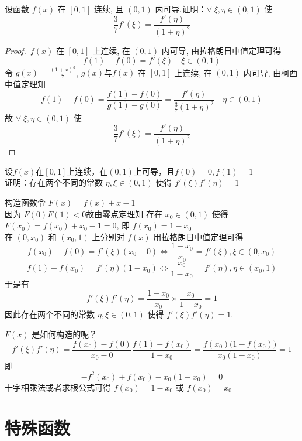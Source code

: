 \documentclass[color=green,titlestyle=hang]{elegantbook}%
\begin{document}
\begin{example}
设函数 $f(x)$ 在 $[0,1]$ 连续, 且 $(0,1)$ 内可导.证明：$\forall\;\xi,\eta\in(0,1)$ 使 \[\frac{3}{7}f'(\xi)=\frac{f'(\eta)}{(1+\eta)^2}\]
\end{example}\begin{proof}
\,$f(x)$ 在 $[0,1]$ 上连续,  在 $(0,1)$ 内可导, 由拉格朗日中值定理可得
\[f(1)-f(0)=f'(\xi)\quad\xi\in(0,1)\]
令 $g(x)=\frac{(1+x)^3}{7}$,  $g(x)$与$f(x)$ 在 $[0,1]$ 上连续,  在 $(0,1)$ 内可导, 由柯西中值定理知  \[f(1)-f(0)=\frac{f(1)-f(0)}{g(1)-g(0)}=\frac{f'(\eta)}{\frac{3}{7}(1+\eta)^2}\quad\eta\in(0,1)\]
故 $\forall\;\xi,\eta\in(0,1)$ 使 \[\frac{3}{7}f'(\xi)=\frac{f'(\eta)}{(1+\eta)^2}\]	
\end{proof}

\begin{example}
设$f(x)$在$[0,1]$上连续，在$(0,1)$上可导，且$f(0)=0,f(1)=1$\,\\
证明：存在两个不同的常数 $\eta,\xi\in(0,1)$ 使得 $f'(\xi)f'(\eta)=1$
\end{example}\begin{solution}
构造函数令 $F(x)=f(x)+x-1$\\
因为 $F(0)F(1)<0$故由零点定理知 存在 $x_0\in(0,1)$ 使得 $F(x_0)=f(x_0)+x_0-1=0$, 即 $f(x_0)=1-x_0$\\
在 $(0,x_0)$ 和 $(x_0,1)$ 上分别对 $f(x)$ 用拉格朗日中值定理可得
\[f(x_0)-f(0)=f'(\xi)(x_0-0)\Leftrightarrow \frac{1-x_0}{x_0}=f'(\xi),\xi\in(0,x_0)\]
\[f(1)-f(x_0)=f'(\eta)(1-x_0)\Leftrightarrow \frac{x_0}{1-x_0}=f'(\eta),\eta\in(x_0,1)\]
于是有
\[f'(\xi)f'(\eta)=\frac{1-x_0}{x_0}\times\frac{x_0}{1-x_0}=1\]
因此存在两个不同的常数 $\eta,\xi\in(0,1)$ 使得 $f'(\xi)f'(\eta)=1$. 
\end{solution}
\begin{remark}
$F(x)$ 是如何构造的呢？%
\[f'(\xi)f'(\eta)
=\frac{f(x_0)-f(0)}{x_0-0}\frac{f(1)-f(x_0)}{1-x_0}=\frac{f(x_0)\big(1-f(x_0)\big)}{x_0(1-x_0)}=1\]
即
\[-f^2(x_0)+f(x_0)-x_0(1-x_0)=0\]
十字相乘法或者求根公式可得 $f(x_0)=1-x_0$ 或 $f(x_0)=x_0$
\end{remark}

\chapter{特殊函数}
\end{document}
